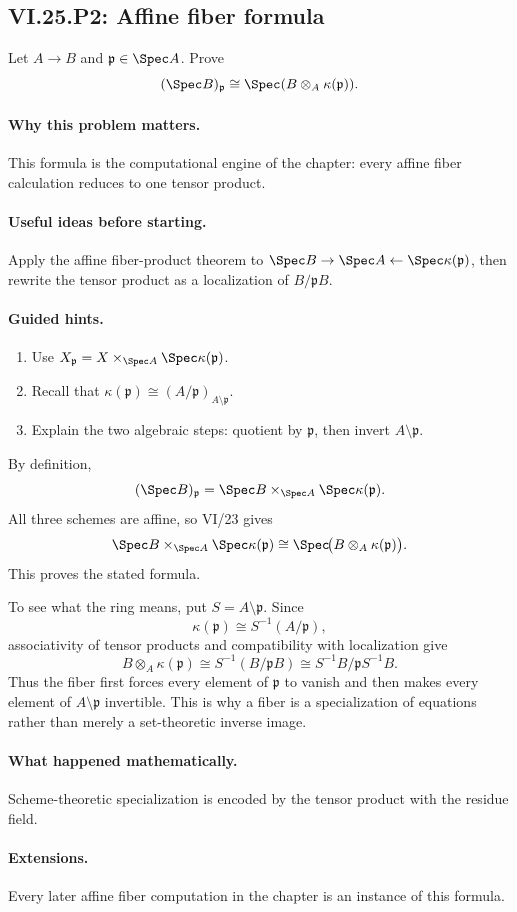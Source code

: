 \subsection*{VI.25.P2: Affine fiber formula}
\begin{problem}\label{prob:vi25-p02}
Let \(A\to B\) and \(\mathfrak p\in\Spec A\).  Prove
\[
(\Spec B)_{\mathfrak p}\cong\Spec(B\otimes_A\kappa(\mathfrak p)).
\]
\end{problem}

\ifdefined\FullProblemDossiers
\paragraph{Why this problem matters.}
This formula is the computational engine of the chapter: every affine fiber calculation reduces to one tensor product.

\paragraph{Useful ideas before starting.}
Apply the affine fiber-product theorem to \(\Spec B\to\Spec A\leftarrow\Spec\kappa(\mathfrak p)\), then rewrite the tensor product as a localization of \(B/\mathfrak pB\).

\paragraph{Guided hints.}
\begin{enumerate}
\item Use \(X_{\mathfrak p}=X\times_{\Spec A}\Spec\kappa(\mathfrak p)\).
\item Recall that \(\kappa(\mathfrak p)\cong (A/\mathfrak p)_{A\setminus\mathfrak p}\).
\item Explain the two algebraic steps: quotient by \(\mathfrak p\), then invert \(A\setminus\mathfrak p\).
\end{enumerate}

\begin{solution}
By definition,
\[
(\Spec B)_{\mathfrak p}
=
\Spec B\times_{\Spec A}\Spec\kappa(\mathfrak p).
\]
All three schemes are affine, so VI/23 gives
\[
\Spec B\times_{\Spec A}\Spec\kappa(\mathfrak p)
\cong
\Spec\!\bigl(B\otimes_A\kappa(\mathfrak p)\bigr).
\]
This proves the stated formula.

To see what the ring means, put \(S=A\setminus\mathfrak p\).  Since
\[
\kappa(\mathfrak p)
\cong
S^{-1}(A/\mathfrak p),
\]
associativity of tensor products and compatibility with localization give
\[
B\otimes_A\kappa(\mathfrak p)
\cong
S^{-1}(B/\mathfrak p B)
\cong
S^{-1}B/\mathfrak p S^{-1}B.
\]
Thus the fiber first forces every element of \(\mathfrak p\) to vanish and then makes every element of \(A\setminus\mathfrak p\) invertible.  This is why a fiber is a specialization of equations rather than merely a set-theoretic inverse image.
\end{solution}

\paragraph{What happened mathematically.}
Scheme-theoretic specialization is encoded by the tensor product with the residue field.

\paragraph{Extensions.}
Every later affine fiber computation in the chapter is an instance of this formula.
\fi
